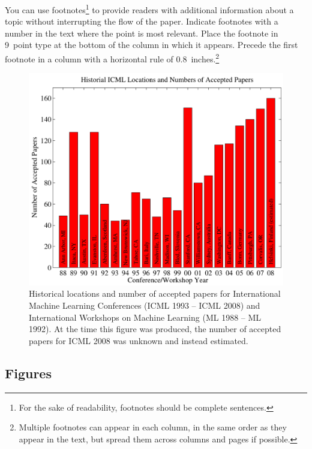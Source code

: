 \documentclass{article}
\begin{document}
You can use footnotes\footnote{For the sake of readability, footnotes
should be complete sentences.} to provide readers with additional
information about a topic without interrupting the flow of the paper. 
Indicate footnotes with a number in the text where the point is most
relevant. Place the footnote in 9~point type at the bottom of the
column in which it appears. Precede the first footnote in a column
with a horizontal rule of 0.8~inches.\footnote{Multiple footnotes can
appear in each column, in the same order as they appear in the text,
but spread them across columns and pages if possible.}

\begin{figure}[ht]
\vskip 0.2in
\begin{center}
\centerline{\includegraphics[width=\columnwidth]{icml_numpapers}}
\caption{Historical locations and number of accepted papers for International
  Machine Learning Conferences (ICML 1993 -- ICML 2008) and
  International Workshops on Machine Learning (ML 1988 -- ML
  1992). At the time this figure was produced, the number of
  accepted papers for ICML 2008 was unknown and instead estimated.}
\label{icml-historical}
\end{center}
\vskip -0.2in
\end{figure} 

\subsection{Figures}
 
\end{document}
